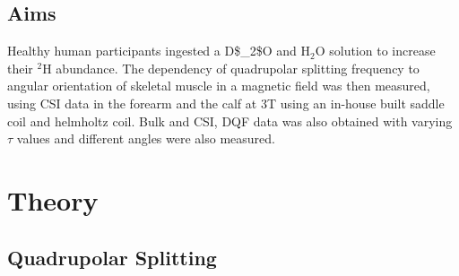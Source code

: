 \subsection{Aims}

Healthy human participants ingested a \ac{D$_2$O} and H$_2$O solution to increase their $^2$H abundance. The dependency of quadrupolar splitting frequency to angular orientation of skeletal muscle in a magnetic field was then measured, using \ac{CSI} data in the forearm and the calf at 3T using an in-house built saddle coil and helmholtz coil. Bulk and \ac{CSI}, \ac{DQF} data was also obtained with varying $\tau$ values and different angles were also measured. 

\section{Theory}
\subsection{Quadrupolar Splitting}

